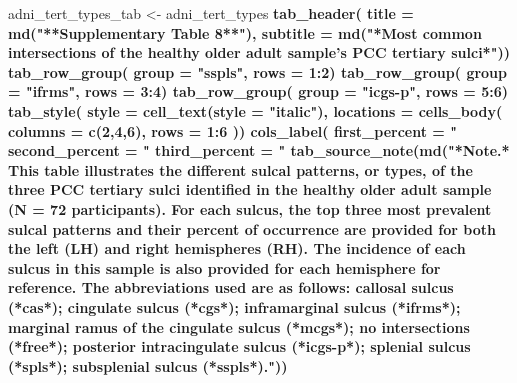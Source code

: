 \documentclass[
]{article}
\newenvironment{Shaded}{\begin{snugshade}}{\end{snugshade}}
\newcommand{\DataTypeTok}[1]{\textcolor[rgb]{0.13,0.29,0.53}{#1}}
\newcommand{\DecValTok}[1]{\textcolor[rgb]{0.00,0.00,0.81}{#1}}
\newcommand{\KeywordTok}[1]{\textcolor[rgb]{0.13,0.29,0.53}{\textbf{#1}}}
\newcommand{\NormalTok}[1]{#1}
\newcommand{\OperatorTok}[1]{\textcolor[rgb]{0.81,0.36,0.00}{\textbf{#1}}}
\newcommand{\StringTok}[1]{\textcolor[rgb]{0.31,0.60,0.02}{#1}}
\begin{document}
\begin{Shaded}
\begin{Highlighting}[]
\NormalTok{adni_tert_types_tab <-}\StringTok{ }\NormalTok{adni_tert_types }\OperatorTok{%>%}\StringTok{ }\KeywordTok{gt}\NormalTok{() }\OperatorTok{%>%}
\KeywordTok{tab_header}\NormalTok{(}
  \DataTypeTok{title =} \KeywordTok{md}\NormalTok{(}\StringTok{"**Supplementary Table 8**"}\NormalTok{),}
  \DataTypeTok{subtitle =} \KeywordTok{md}\NormalTok{(}\StringTok{"*Most common intersections of the healthy older adult sample's PCC tertiary sulci*"}\NormalTok{)) }\OperatorTok{%>%}
\KeywordTok{tab_row_group}\NormalTok{(}
    \DataTypeTok{group =} \StringTok{"sspls"}\NormalTok{,}
    \DataTypeTok{rows =} \DecValTok{1}\OperatorTok{:}\DecValTok{2}\NormalTok{) }\OperatorTok{%>%}
\KeywordTok{tab_row_group}\NormalTok{(}
    \DataTypeTok{group =} \StringTok{"ifrms"}\NormalTok{,}
    \DataTypeTok{rows =} \DecValTok{3}\OperatorTok{:}\DecValTok{4}\NormalTok{) }\OperatorTok{%>%}
\KeywordTok{tab_row_group}\NormalTok{(}
    \DataTypeTok{group =} \StringTok{"icgs-p"}\NormalTok{,}
    \DataTypeTok{rows =} \DecValTok{5}\OperatorTok{:}\DecValTok{6}\NormalTok{) }\OperatorTok{%>%}
\KeywordTok{tab_style}\NormalTok{(}
    \DataTypeTok{style =} \KeywordTok{cell_text}\NormalTok{(}\DataTypeTok{style =} \StringTok{"italic"}\NormalTok{),}
    \DataTypeTok{locations =} \KeywordTok{cells_body}\NormalTok{(}
      \DataTypeTok{columns =} \KeywordTok{c}\NormalTok{(}\DecValTok{2}\NormalTok{,}\DecValTok{4}\NormalTok{,}\DecValTok{6}\NormalTok{),}
      \DataTypeTok{rows =} \DecValTok{1}\OperatorTok{:}\DecValTok{6}
\NormalTok{    )) }\OperatorTok{%>%}
\KeywordTok{cols_label}\NormalTok{(}
    \DataTypeTok{first_percent =} \StringTok{"%"}\NormalTok{,}
    \DataTypeTok{second_percent =} \StringTok{"%"}\NormalTok{,}
    \DataTypeTok{third_percent =} \StringTok{"%"}\NormalTok{) }\OperatorTok{%>%}
\KeywordTok{tab_source_note}\NormalTok{(}\KeywordTok{md}\NormalTok{(}\StringTok{"*Note.* This table illustrates the different sulcal patterns, or types, of the three PCC tertiary sulci identified in the healthy older adult sample (N = 72 participants). For each sulcus, the top three most prevalent sulcal patterns and their percent of occurrence are provided for both the left (LH) and right hemispheres (RH). The incidence of each sulcus in this sample is also provided for each hemisphere for reference. The abbreviations used are as follows: callosal sulcus (*cas*); cingulate sulcus (*cgs*); inframarginal sulcus (*ifrms*); marginal ramus of the cingulate sulcus (*mcgs*); no intersections (*free*); posterior intracingulate sulcus (*icgs-p*); splenial sulcus (*spls*); subsplenial sulcus (*sspls*)."}\NormalTok{)) }\OperatorTok{%>%}
}}}}}}}}}}
\end{Highlighting}
\end{Shaded}
\end{document}
